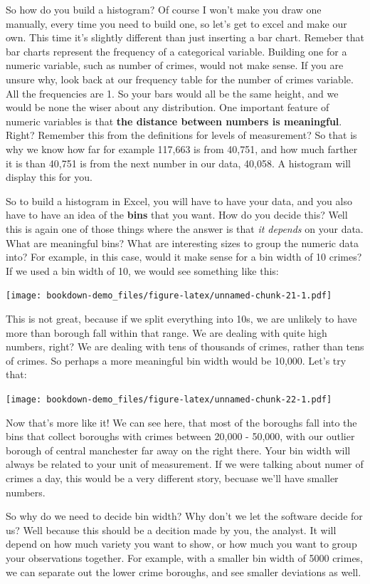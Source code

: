 \documentclass[]{book}
\theoremstyle{definition}
\theoremstyle{definition}
\theoremstyle{definition}
\theoremstyle{remark}
\begin{document}
So how do you build a histogram? Of course I won't make you draw one
manually, every time you need to build one, so let's get to excel and
make our own. This time it's slightly different than just inserting a
bar chart. Remeber that bar charts represent the frequency of a
categorical variable. Building one for a numeric variable, such as
number of crimes, would not make sense. If you are unsure why, look back
at our frequency table for the number of crimes variable. All the
frequencies are 1. So your bars would all be the same height, and we
would be none the wiser about any distribution. One important feature of
numeric variables is that \textbf{the distance between numbers is
meaningful}. Right? Remember this from the definitions for levels of
measurement? So that is why we know how far for example 117,663 is from
40,751, and how much farther it is than 40,751 is from the next number
in our data, 40,058. A histogram will display this for you.

 So to build a histogram in Excel, you will have to have your data, and
you also have to have an idea of the \textbf{bins} that you want. How do
you decide this? Well this is again one of those things where the answer
is that \emph{it depends} on your data. What are meaningful bins? What
are interesting sizes to group the numeric data into? For example, in
this case, would it make sense for a bin width of 10 crimes? If we used
a bin width of 10, we would see something like this:

\texttt{[image: bookdown-demo\_files/figure-latex/unnamed-chunk-21-1.pdf]}

This is not great, because if we split everything into 10s, we are
unlikely to have more than borough fall within that range. We are
dealing with quite high numbers, right? We are dealing with tens of
thousands of crimes, rather than tens of crimes. So perhaps a more
meaningful bin width would be 10,000. Let's try that:

\texttt{[image: bookdown-demo\_files/figure-latex/unnamed-chunk-22-1.pdf]}

Now that's more like it! We can see here, that most of the boroughs fall
into the bins that collect boroughs with crimes between 20,000 - 50,000,
with our outlier borough of central manchester far away on the right
there. Your bin width will always be related to your unit of
measurement. If we were talking about numer of crimes a day, this would
be a very different story, becuase we'll have smaller numbers.

So why do we need to decide bin width? Why don't we let the software
decide for us? Well because this should be a decition made by you, the
analyst. It will depend on how much variety you want to show, or how
much you want to group your observations together. For example, with a
smaller bin width of 5000 crimes, we can separate out the lower crime
boroughs, and see smaller deviations as well.
\end{document}
